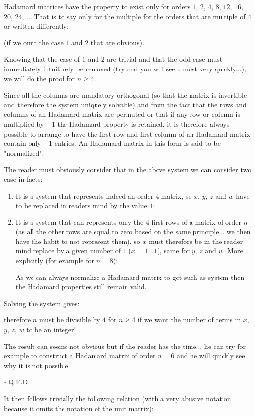 	\begin{theorem} 
	Hadamard matrices have the property to exist only for orders $1$, $2$, $4$, $8$, $12$, $16$, $20$, $24$, ... That is to say only for the multiple for the orders that are multiple of $4$ or written differently:
	
	 (if we omit the case $1$ and $2$ that are obvious).
	\end{theorem}
	\begin{dem}
	Knowing that the case of $1$ and $2$ are trivial and that the odd case must immediately intuitively be removed (try and you will see almost very quickly...), we will do the proof for $n\geq 4$.
	
	Since all the columns are mandatory orthogonal (so that the matrix is invertible and therefore the system uniquely solvable) and from the fact that the rows and columns of an Hadamard matrix are permuted or that if any row or column is multiplied by $-1$ the Hadamard property is retained, it is therefore always possible to arrange to have the first row and first column of an Hadamard matrix contain only $+1$ entries. An Hadamard matrix in this form is said to be "normalized":
	
	The reader must obviously consider that in the above system we can consider two case in facts:
	\begin{enumerate}
		\item It is a system that represents indeed an order $4$ matrix, so $x$, $y$, $z$ and $w$ have to be replaced in readers mind by the value $1$:
		

		\item It is a system that can represents only the $4$ first rows of a matrix of order $n$ (as all the other rows are equal to zero based on the same principle... we then have the habit to not represent them), so $x$ must therefore be in the reader mind replace by a given number of $1$ ($x=1\ldots 1$), same for $y$, $z$ and $w$. More explicitly (for example for $n=8$):
		
		As we can always normalize a Hadamard matrix to get such as system then the Hadamard properties still remain valid.
	\end{enumerate}
	Solving the system gives:
	
	therefore $n$ must be divisible by $4$ for $n \geq 4$ if we want the number of terms in $x$, $y$, $z$, $w$ to be an integer!
	
	The result can seems not obvious but if the reader has the time... he can try for example to construct a Hadamard matrix of order $n=6$ and he will quickly see why it is not possible.
	\begin{flushright}
		$\square$  Q.E.D.
	\end{flushright}
	\end{dem}
	It then follows trivially the following relation (with a very abusive notation because it omits the notation of the unit matrix):
	
